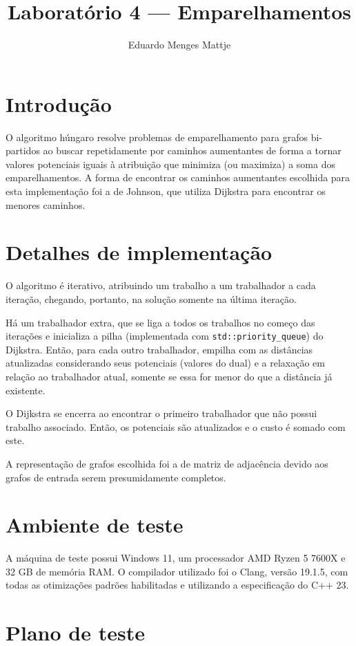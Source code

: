 \documentclass[11pt]{article}
\title{Laboratório 4 — Emparelhamentos}
\author{Eduardo Menges Mattje}
\begin{document}
\maketitle

\section{Introdução}
O algoritmo húngaro resolve problemas de emparelhamento para grafos bi-partidos ao buscar repetidamente por caminhos aumentantes de forma a tornar valores potenciais iguais à atribuição que minimiza (ou maximiza) a soma dos emparelhamentos.
A forma de encontrar os caminhos aumentantes escolhida para esta implementação foi a de Johnson, que utiliza Dijkstra para encontrar os menores caminhos.

\section{Detalhes de implementação}
\label{sec:implementation-details}

O algoritmo é iterativo, atribuindo um trabalho a um trabalhador a cada iteração, chegando, portanto, na solução somente na última iteração.

Há um trabalhador extra, que se liga a todos os trabalhos no começo das iterações e inicializa a pilha (implementada com \lstinline|std::priority_queue|) do Dijkstra.
Então, para cada outro trabalhador, empilha com as distâncias atualizadas considerando seus potenciais (valores do dual) e a relaxação em relação ao trabalhador atual, somente se essa for menor do que a distância já existente.

O Dijkstra se encerra ao encontrar o primeiro trabalhador que não possui trabalho associado.
Então, os potenciais são atualizados e o custo é somado com este.

A representação de grafos escolhida foi a de matriz de adjacência devido aos grafos de entrada serem presumidamente completos.

\section{Ambiente de teste}

A máquina de teste possui Windows 11, um processador AMD Ryzen 5 7600X e 32 GB de memória RAM. O compilador utilizado foi o Clang, versão 19.1.5, com todas as otimizações padrões habilitadas e utilizando a especificação do C++ 23.

\section{Plano de teste}
\end{document}

